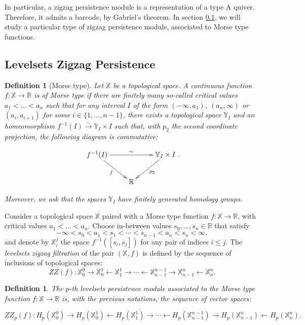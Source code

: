 \documentclass[11pt]{article}
\newtheorem{definition}[theorem]{Definition}
\theoremstyle{remark}
\newcommand{\R}{\mathbb{R}}
\newcommand{\X}{\mathbb{X}}
\newcommand{\Y}{\mathbb{Y}}
\begin{document}
\noindent In particular, a zigzag persistence module is a representation of a type A quiver. Therefore, it admits a barcode, by Gabriel's theorem. In section \ref{LZZ_subsection}, we will study a particular type of zigzag persistence module, associated to Morse type functions.

\subsection{Levelsets Zigzag Persistence}

\label{LZZ_subsection}

\begin{definition}[Morse type]
Let $\X$ be a topological space. A continuous function $f:\X\rightarrow \R$ is of \emph{Morse type} if there are finitely many so-called \emph{critical values} $a_1<...<a_n$ such that for any interval $I$ of the form $(-\infty,a_1)$, $(a_n,\infty)$ or $(a_i,a_{i+1})$ for some $i\in\{1,...,n-1\}$, there exists a topological space $\Y_I$ and an homeomorphism $f^{-1}(I) \stackrel{\sim}{\longrightarrow} \Y_I \times I$ such that, with $p_2$ the second coordinate projection, the following diagram is commutative:

\[ \xymatrix{f^{-1}(I) \ar[rr]^{\sim} \ar[rd]_{f} & & \Y_I \times I \ar[ld]^{p_2} \\
& \R &}. \]


Moreover, we ask that the spaces $\Y_I$ have finitely generated homology groups.
\end{definition}

\noindent Consider a topological space $\X$ paired with a Morse type function $f:\X\rightarrow\R$, with critical values $a_1<...<a_n$. Choose in-between values $s_0,...,s_n\in\R$ that satisfy $$-\infty<s_0<a_1<s_1<\cdots<s_{n-1}<a_n<s_n<\infty,$$ and denote by $\X_i^j$ the space $f^{-1}([s_i,s_j])$ for any pair of indices $i\leq j$. The \textit{levelsets zigzag filtration} of the pair $(\X,f)$ is defined by the sequence of inclusions of topological spaces: 
$$ZZ(f) : \X_0^0\rightarrow\X_0^1\leftarrow\X_1^1\rightarrow\cdots\leftarrow\X_{n-1}^{n-1}\rightarrow\X_{n-1}^n\leftarrow\X_n^n.$$ 

\begin{definition}
The $p$-th levelsets persistence module associated to the Morse type function $f : \X \longrightarrow \R$ is, with the previous notations, the sequence of vector spaces:

$$ZZ_p(f) : H_p(\X_0^0)\rightarrow H_p(\X_0^1)\leftarrow H_p(\X_1^1) \rightarrow\cdots\leftarrow H_p(\X_{n-1}^{n-1}) \rightarrow H_p(\X_{n-1}^n) \leftarrow H_p(\X_n^n).$$ 
\end{definition}
\end{document}
